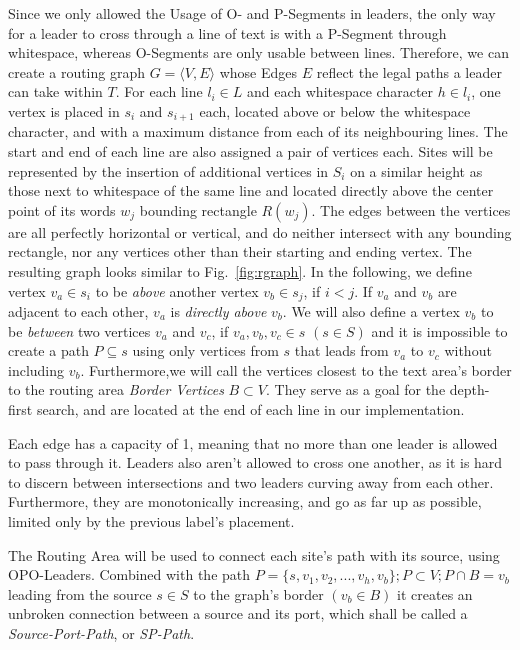 \documentclass[11pt,a4paper]{vutinfth}
\begin{document}
Since we only allowed the Usage of O- and P-Segments in leaders, the only way for a leader to cross through a line of text is with a P-Segment through whitespace, whereas O-Segments are only usable between lines. Therefore, we can create a routing graph $G=\langle V,E\rangle$ whose Edges $E$ reflect the legal paths a leader can take within $T$.
For each line $l_i \in L$ and each whitespace character $h \in l_i$, one vertex is placed in $s_i$ and $s_{i+1}$ each, located above or below the whitespace character, and with a maximum distance from each of its neighbouring lines. The start and end of each line are also assigned a pair of vertices each. Sites will be represented by the insertion of additional vertices in $S_i$ on a similar height as those next to whitespace of the same line and located directly above the center point of its words $w_j$ bounding rectangle $R(w_j)$. The edges between the vertices are all perfectly horizontal or vertical, and do neither intersect with any bounding rectangle, nor any vertices other than their starting and ending vertex. The resulting graph looks similar to Fig.~\ref*{fig:rgraph}.
In the following, we define vertex $v_a \in s_i$ to be \emph{above} another vertex $v_b \in s_j$, if $i<j$. If $v_a$ and $v_b$ are adjacent to each other, $v_a$ is \emph{directly above} $v_b$. We will also define a vertex $v_b$ to be \emph{between} two vertices $v_a$ and $v_c$, if $v_a, v_b, v_c \in s$ $(s \in S)$ and it is impossible to create a path $P \subseteq s$ using only vertices from $s$ that leads from $v_a$ to $v_c$ without including $v_b$.
Furthermore,we will call the vertices closest to the text area's border to the routing area \emph{Border Vertices} $B \subset V$. They serve as a goal for the depth-first search, and are located at the end of each line in our implementation.

Each edge has a capacity of 1, meaning that no more than one leader is allowed to pass through it. Leaders also aren't allowed to cross one another, as it is hard to discern between intersections and two leaders curving away from each other. Furthermore, they are monotonically increasing, and go as far up as possible, limited only by the previous label's placement.

The Routing Area will be used to connect each site's path with its source, using OPO-Leaders. Combined with the path $P=\{s, v_1, v_2, ..., v_h, v_b\}; P \subset V; P \cap B = v_b$ leading from the source $s \in S$ to the graph's border $(v_b \in B)$ it creates an unbroken connection between a source and its port, which shall be called a \emph{Source-Port-Path}, or \emph{SP-Path}.
\end{document}

